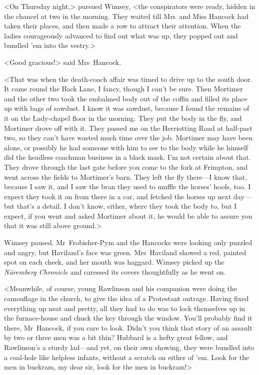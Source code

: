 <On Thursday night,> pursued Wimsey, <the conspirators were ready, hidden in the chancel at two in the morning. They waited till Mrs~and Miss Hancock had taken their places, and then made a row to attract their attention. When the ladies courageously advanced to find out what was up, they popped out and bundled 'em into the vestry.>

<Good gracious!> said Mrs~Hancock.

<That was when the death-coach affair was timed to drive up to the south door. It came round the Back Lane, I fancy, though I can't be sure. Then Mortimer and the other two took the embalmed body out of the coffin and filled its place up with bags of sawdust. I know it was sawdust, because I found the remains of it on the Lady-chapel floor in the morning. They put the body in the fly, and Mortimer drove off with it. They passed me on the Herriotting Road at half-past two, so they can't have wasted much time over the job. Mortimer may have been alone, or possibly he had someone with him to see to the body while he himself did the headless coachman business in a black mask. I'm not certain about that. They drove through the last gate before you come to the fork at Frimpton, and went across the fields to Mortimer's barn. They left the fly there—I know that, because I saw it, and I saw the bran they used to muffle the horses' hoofs, too. I expect they took it on from there in a car, and fetched the horses up next day—but that's a detail. I don't know, either, where they took the body to, but I expect, if you went and asked Mortimer about it, he would be able to assure you that it was still above ground.>

Wimsey paused. Mr~Frobisher-Pym and the Hancocks were looking only puzzled and angry, but Haviland's face was green. Mrs~Haviland showed a red, painted spot on each cheek, and her mouth was haggard. Wimsey picked up the \textit{Nüremberg Chronicle} and caressed its covers thoughtfully as he went on.

<Meanwhile, of course, young Rawlinson and his companion were doing the camouflage in the church, to give the idea of a Protestant outrage. Having fixed everything up neat and pretty, all they had to do was to lock themselves up in the furnace-house and chuck the key through the window. You'll probably find it there, Mr~Hancock, if you care to look. Didn't you think that story of an assault by two or three men was a bit thin? Hubbard is a hefty great fellow, and Rawlinson's a sturdy lad—and yet, on their own showing, they were bundled into a coal-hole like helpless infants, without a scratch on either of 'em. Look for the men in buckram, my dear sir, look for the men in buckram!>

